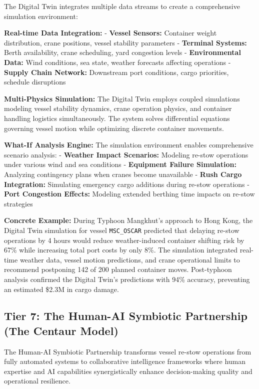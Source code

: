\documentclass{article}
\begin{document}
The Digital Twin integrates multiple data streams to create a comprehensive simulation environment:

\textbf{Real-time Data Integration:}
- \textbf{Vessel Sensors:} Container weight distribution, crane positions, vessel stability parameters
- \textbf{Terminal Systems:} Berth availability, crane scheduling, yard congestion levels
- \textbf{Environmental Data:} Wind conditions, sea state, weather forecasts affecting operations
- \textbf{Supply Chain Network:} Downstream port conditions, cargo priorities, schedule disruptions

\textbf{Multi-Physics Simulation:}
The Digital Twin employs coupled simulations modeling vessel stability dynamics, crane operation physics, and container handling logistics simultaneously. The system solves differential equations governing vessel motion while optimizing discrete container movements.

\textbf{What-If Analysis Engine:}
The simulation environment enables comprehensive scenario analysis:
- \textbf{Weather Impact Scenarios:} Modeling re-stow operations under various wind and sea conditions
- \textbf{Equipment Failure Simulation:} Analyzing contingency plans when cranes become unavailable
- \textbf{Rush Cargo Integration:} Simulating emergency cargo additions during re-stow operations
- \textbf{Port Congestion Effects:} Modeling extended berthing time impacts on re-stow strategies

\textbf{Concrete Example:} During Typhoon Mangkhut's approach to Hong Kong, the Digital Twin simulation for vessel \texttt{MSC\_OSCAR} predicted that delaying re-stow operations by 4 hours would reduce weather-induced container shifting risk by 67\% while increasing total port costs by only 8\%. The simulation integrated real-time weather data, vessel motion predictions, and crane operational limits to recommend postponing 142 of 200 planned container moves. Post-typhoon analysis confirmed the Digital Twin's predictions with 94\% accuracy, preventing an estimated \$2.3M in cargo damage.

\subsection{Tier 7: The Human-AI Symbiotic Partnership (The Centaur Model)}

The Human-AI Symbiotic Partnership transforms vessel re-stow operations from fully automated systems to collaborative intelligence frameworks where human expertise and AI capabilities synergistically enhance decision-making quality and operational resilience.
\end{document}
